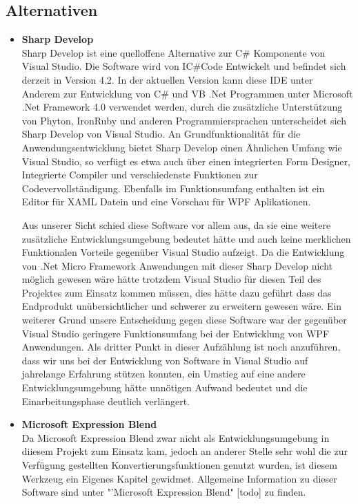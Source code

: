 \subsection{Alternativen}
\begin{itemize}
\item \textbf{Sharp Develop}\\
Sharp Develop ist eine quelloffene Alternative zur C\# Komponente von Visual Studio. Die Software wird von IC\#Code Entwickelt und befindet sich derzeit in Version 4.2.
In der aktuellen Version kann diese IDE unter Anderem zur Entwicklung von C\# und VB .Net Programmen unter Microsoft .Net Framework 4.0 verwendet werden, durch die zusätzliche Unterstützung von Phyton, IronRuby und anderen Programmiersprachen unterscheidet sich Sharp Develop von Visual Studio.
An Grundfunktionalität für die Anwendungsentwicklung bietet Sharp Develop einen Ähnlichen Umfang wie Visual Studio, so verfügt es etwa auch über einen integrierten Form Designer, Integrierte Compiler und verschiedenste Funktionen zur Codevervollständigung. Ebenfalls im Funktionsumfang enthalten ist ein Editor für XAML Datein und eine Vorschau für WPF Aplikationen.

Aus unserer Sicht schied diese Software vor allem aus, da sie eine weitere zusätzliche Entwicklungsumgebung bedeutet hätte und auch keine merklichen Funktionalen Vorteile gegenüber Visual Studio aufzeigt.
Da die Entwicklung von .Net Micro Framework Anwendungen mit dieser Sharp Develop nicht möglich gewesen wäre hätte trotzdem Visual Studio für diesen Teil des Projektes zum Einsatz kommen müssen, dies hätte dazu geführt dass das Endprodukt unübersichtlicher und schwerer zu erweitern gewesen wäre.
Ein weiterer Grund unsere Entscheidung gegen diese Software war der gegenüber Visual Studio geringere Funktionsumfang bei der Entwicklung von WPF Anwendungen.
Als dritter Punkt in dieser Aufzählung ist noch anzuführen, dass wir uns bei der Entwicklung von Software in Visual Studio auf jahrelange Erfahrung stützen konnten, ein Umstieg auf eine andere Entwicklungsumgebung hätte unnötigen Aufwand bedeutet und die Einarbeitungsphase deutlich verlängert.
\item \textbf{Microsoft Expression Blend}\\
Da Microsoft Expression Blend zwar nicht als Entwicklungsumgebung in diiesem Projekt zum Einsatz kam, jedoch an anderer Stelle sehr wohl die zur Verfügung gestellten Konvertierungsfunktionen genutzt wurden, ist diesem Werkzeug ein Eigenes Kapitel gewidmet. Allgemeine Information zu dieser Software sind unter "'Microsoft Expression Blend" [todo] zu finden.


\end{itemize}
